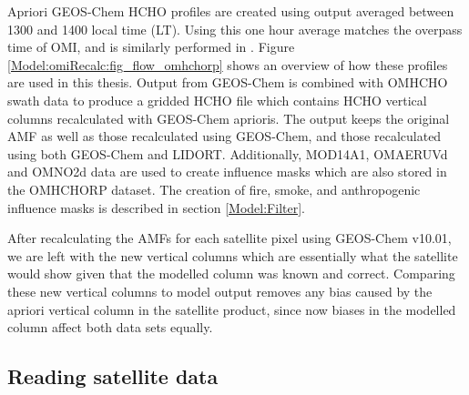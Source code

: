   Apriori GEOS-Chem HCHO profiles are created using output averaged between 1300 and 1400 local time (LT).
  Using this one hour average matches the overpass time of OMI, and is similarly performed in \textcite{Jin2017}.
  Figure \ref{Model:omiRecalc:fig_flow_omhchorp} shows an overview of how these profiles are used in this thesis.
  Output from GEOS-Chem is combined with OMHCHO swath data to produce a gridded HCHO file which contains HCHO vertical columns recalculated with GEOS-Chem aprioris.
  The output keeps the original AMF as well as those recalculated using GEOS-Chem, and those recalculated using both GEOS-Chem and LIDORT.
  Additionally, MOD14A1, OMAERUVd and OMNO2d data are used to create influence masks which are also stored in the OMHCHORP dataset.
  The creation of fire, smoke, and anthropogenic influence masks is described in section \ref{Model:Filter}.
  
  
  After recalculating the AMFs for each satellite pixel using GEOS-Chem v10.01, we are left with the new vertical columns which are essentially what the satellite would show given that the modelled column was known and correct.
  Comparing these new vertical columns to model output removes any bias caused by the apriori vertical column in the satellite product, since now biases in the modelled column affect both data sets equally.
  
  \subsection{Reading satellite data}
    
